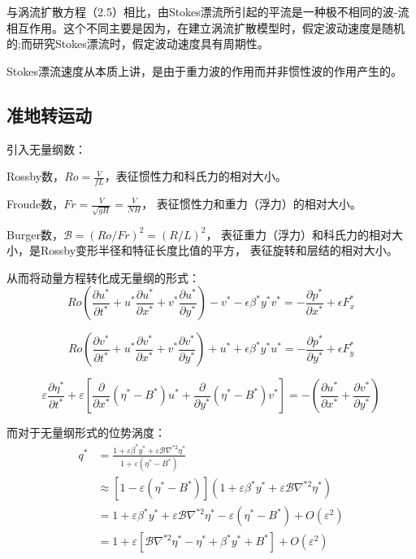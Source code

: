\documentclass{article}
\begin{document}
与涡流扩散方程（2.5）相比，由Stokes漂流所引起的平流是一种极不相同的波-流相互作用。这个不同主要是因为，在建立涡流扩散模型时，假定波动速度是随机的;而研究Stokes漂流时，假定波动速度具有周期性。

Stokes漂流速度从本质上讲，是由于重力波的作用而并非惯性波的作用产生的。

\subsection{准地转运动}
引入无量纲数：

Rossby数，$Ro=\frac{V}{fL}$，表征惯性力和科氏力的相对大小。

Froude数，$Fr = \frac{V}{\sqrt{gH}} = \frac{V}{NH}$，
表征惯性力和重力（浮力）的相对大小。

Burger数，$\mathcal{B} = (Ro/Fr)^2 = (R/L)^2$，
表征重力（浮力）和科氏力的相对大小，是Rossby变形半径和特征长度比值的平方，
表征旋转和层结的相对大小。

从而将动量方程转化成无量纲的形式：
$$Ro(\frac{\partial u^*}{\partial t^*} 
+ u^*\frac{\partial u^*}{\partial x^*}
+ v^*\frac{\partial u^*}{\partial y^*}) - v^* - \epsilon \beta^*y^*v^* 
= -\frac{\partial p^* }{\partial x^*} + \epsilon F_x^*$$

$$Ro(\frac{\partial v^*}{\partial t^*} 
+ u^*\frac{\partial v^*}{\partial x^*}
+ v^*\frac{\partial v^*}{\partial y^*}) + u^* + \epsilon \beta^*y^*u^* 
= -\frac{\partial p^* }{\partial y^*} + \epsilon F_y^*$$

$$\varepsilon \frac{\partial {{\eta }^{*}}}{\partial {{t}^{*}}}
+\varepsilon \left[ \frac{\partial }{\partial {{x}^{*}}}({{\eta }^{*}}
-{{B}^{*}}){{u}^{*}}+\frac{\partial }{\partial {{y}^{*}}}({{\eta }^{*}}
-{{B}^{*}}){{v}^{*}} \right]
=-\left( \frac{\partial {{u}^{*}}}{\partial {{x}^{*}}}
+\frac{\partial {{v}^{*}}}{\partial {{y}^{*}}} \right)$$

而对于无量纲形式的位势涡度：
\begin{align*}    
    q^* & =\frac{1+\varepsilon\beta^*y^*+\varepsilon\mathcal{B}\nabla^{*2}\eta^*}{1+\varepsilon(\eta^*-B^*)} \\     
    & \approx \left[ 1-\varepsilon\left( \eta^*-B^* \right) \right]\left( 1+\varepsilon\beta^*y^*+\varepsilon\mathcal{B}\nabla^{*2}\eta^* \right) \\    
    & = 1+\varepsilon\beta^*y^*+\varepsilon\mathcal{B}\nabla^{*2}\eta^*-\varepsilon\left( \eta^*-B^* \right) + O(\varepsilon^2) \\    
    & = 1+\varepsilon\left[ \mathcal{B}\nabla^{*2}\eta^* - \eta^* + \beta^*y^* + B^* \right] + O(\varepsilon^2)
\end{align*}
\end{document}
